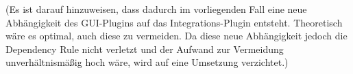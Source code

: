 (Es ist darauf hinzuweisen, dass dadurch im vorliegenden Fall eine neue Abhängigkeit des GUI-Plugins auf das Integrations-Plugin entsteht.
Theoretisch wäre es optimal, auch diese zu vermeiden.
Da diese neue Abhängigkeit jedoch die Dependency Rule nicht verletzt und der Aufwand zur Vermeidung unverhältnismäßig hoch wäre, wird auf eine Umsetzung verzichtet.)
